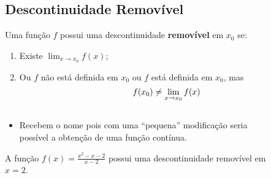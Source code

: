 \subsection{Descontinuidade Removível}
\begin{frame}
  \begin{definition}
    Uma função $f$ possui uma descontinuidade \textbf{removível} em $x_{0}$ se:
    \begin{enumerate}
      \item Existe $\displaystyle\lim_{x\to x_{0}}{f(x)}$;
      \item Ou $f$ não está definida em $x_{0}$ ou $f$ está definida em $x_{0}$, mas\vspace{-0.2cm}
      \begin{equation*}
        f(x_{0})\not=\lim_{x\to x_{0}}{f(x)}\vspace{-0.5cm}
      \end{equation*}
    \end{enumerate}
  \end{definition}
  \begin{columns}[onlytextwidth]
    \begin{column}{0.49\textwidth}
      \begin{itemize}
        \item Recebem o nome pois com uma ``pequena'' modificação seria possível a obtenção de uma função contínua.
      \end{itemize}
      \begin{example-highlight}
        A função $\displaystyle f(x) = \frac{x^{2}-x-2}{x-2}$ possui uma descontinuidade removível em $x=2$.
      \end{example-highlight}
    \end{column}
    \begin{column}{0.49\textwidth}\vspace{-0.5cm}
      \begin{figure}
      \end{figure}
    \end{column}
  \end{columns}
\end{frame}

